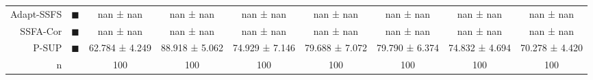 \begin{tabular}{rcccccccc}
Adapt-SSFS &                              \textcolor{ASSFSCMR}{\LARGE $\blacksquare$} &       nan ± nan &       nan ± nan &       nan ± nan &       nan ± nan &       nan ± nan &       nan ± nan &       nan ± nan \\
SSFA-Cor   &                              \textcolor{SFAMCAMT}{\LARGE $\blacksquare$} &       nan ± nan &       nan ± nan &       nan ± nan &       nan ± nan &       nan ± nan &       nan ± nan &       nan ± nan \\
P-SUP      &         \textcolor{PARTIAL_SUPERVISED_CLASSIFIER}{\LARGE $\blacksquare$} &  62.784 ± 4.249 &  88.918 ± 5.062 &  74.929 ± 7.146 &  79.688 ± 7.072 &  79.790 ± 6.374 &  74.832 ± 4.694 &  70.278 ± 4.420 \\
n          &                                                                          &             100 &             100 &             100 &             100 &             100 &             100 &             100 \\
\bottomrule
\end{tabular}
